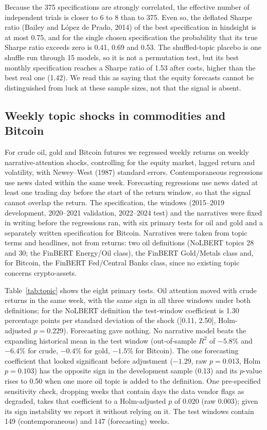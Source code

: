 \documentclass[11pt]{article}
\begin{document}
Because the 375 specifications are strongly correlated, the effective number of independent trials is closer to 6 to 8 than to 375. Even so, the deflated Sharpe ratio (Bailey and L\'opez de Prado, 2014) of the best specification in hindsight is at most 0.75, and for the single chosen specification the probability that its true Sharpe ratio exceeds zero is 0.41, 0.69 and 0.53. The shuffled-topic placebo is one shuffle run through 15 models, so it is not a permutation test, but its best monthly specification reaches a Sharpe ratio of 1.53 after costs, higher than the best real one (1.42). We read this as saying that the equity forecasts cannot be distinguished from luck at these sample sizes, not that the signal is absent.

\subsection{Weekly topic shocks in commodities and Bitcoin}

For crude oil, gold and Bitcoin futures we regressed weekly returns on weekly narrative-attention shocks, controlling for the equity market, lagged return and volatility, with Newey--West (1987) standard errors. Contemporaneous regressions use news dated within the same week. Forecasting regressions use news dated at least one trading day before the start of the return window, so that the signal cannot overlap the return. The specification, the windows (2015--2019 development, 2020--2021 validation, 2022--2024 test) and the narratives were fixed in writing before the regressions ran, with six primary tests for oil and gold and a separately written specification for Bitcoin. Narratives were taken from topic terms and headlines, not from returns: two oil definitions (NoLBERT topics 28 and 30; the FinBERT Energy/Oil class), the FinBERT Gold/Metals class and, for Bitcoin, the FinBERT Fed/Central Banks class, since no existing topic concerns crypto-assets.

Table~\ref{tab:topic} shows the eight primary tests. Oil attention moved with crude returns in the same week, with the same sign in all three windows under both definitions; for the NoLBERT definition the test-window coefficient is 1.30 percentage points per standard deviation of the shock ([0.11, 2.50], Holm-adjusted $p=0.229$). Forecasting gave nothing. No narrative model beats the expanding historical mean in the test window (out-of-sample $R^2$ of $-5.8$\% and $-6.4$\% for crude, $-0.4$\% for gold, $-1.5$\% for Bitcoin). The one forecasting coefficient that looked significant before adjustment ($-1.29$, raw $p=0.013$, Holm $p=0.103$) has the opposite sign in the development sample (0.13) and its $p$-value rises to 0.50 when one more oil topic is added to the definition. One pre-specified sensitivity check, dropping weeks that contain days the data vendor flags as degraded, takes that coefficient to a Holm-adjusted $p$ of 0.020 (raw 0.003); given its sign instability we report it without relying on it. The test windows contain 149 (contemporaneous) and 147 (forecasting) weeks.
\end{document}
